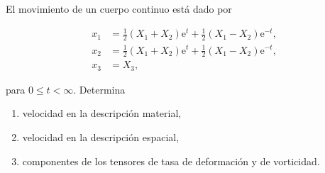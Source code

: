 \documentclass[../main.tex]{subfiles}
\begin{document}
\begin{problema}
	El movimiento de un cuerpo continuo está dado por

	\begin{align*}
		x_{1} & = \tfrac{1}{2}(X_{1} + X_{2})\mathrm{e}^{t} + \tfrac{1}{2}(X_{1} - X_{2})\mathrm{e}^{-t}, \\
		x_{2} & = \tfrac{1}{2}(X_{1} + X_{2})\mathrm{e}^{t} + \tfrac{1}{2}(X_{1} - X_{2})\mathrm{e}^{-t}, \\
		x_{3} & = X_{3},
	\end{align*}

	para \(0 \leq t < \infty\). Determina

	\begin{enumerate}
		\item velocidad en la descripción material,
		\item velocidad en la descripción espacial,
		\item componentes de los tensores de tasa de deformación
		      y de vorticidad.
	\end{enumerate}
\end{problema}
\end{document}
